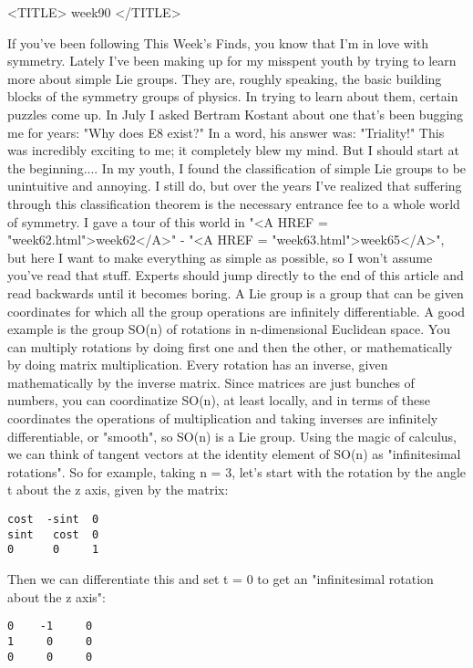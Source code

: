 
<TITLE> week90 </TITLE>


If you've been following This Week's Finds, you know that I'm in love
with symmetry.  Lately I've been making up for my misspent youth by
trying to learn more about simple Lie groups.  They are, roughly 
speaking, the basic building blocks of the symmetry groups of physics.    
In trying to learn about them, certain puzzles come up.  In July 
I asked Bertram Kostant about one that's been bugging me for years:
"Why does E8 exist?"  In a word, his answer was: "Triality!"  This was
incredibly exciting to me; it completely blew my mind.  But I should
start at the beginning....
In my youth, I found the classification of simple Lie groups to be
unintuitive and annoying.  I still do, but over the years I've
realized that suffering through this classification theorem is the
necessary entrance fee to a whole world of symmetry.  I gave a tour of 
this world in "<A HREF = "week62.html">week62</A>" - "<A HREF = 
"week63.html">week65</A>", but here I want to make everything as
simple as possible, so I won't assume you've read that stuff.  Experts
should jump directly to the end of this article and read backwards
until it becomes boring.
A Lie group is a group that can be given coordinates for which all the group
operations are infinitely differentiable.  A good example is the group
SO(n) of rotations in n-dimensional Euclidean space.  You can multiply
rotations by doing first one and then the other, or mathematically by
doing matrix multiplication.  Every rotation has an inverse, given
mathematically by the inverse matrix.  Since matrices are just bunches
of numbers, you can coordinatize SO(n), at least locally, and in terms
of these coordinates the operations of multiplication and taking inverses 
are infinitely differentiable, or "smooth", so SO(n) is a Lie group.
Using the magic of calculus, we can think of tangent vectors at the
identity element of SO(n) as "infinitesimal rotations".  So for
example, taking n = 3, let's start with the rotation by the angle t
about the z axis, given by the matrix:
\begin{verbatim}
cost  -sint  0
sint   cost  0
0      0     1
\end{verbatim}
    
Then we can differentiate this and set t = 0 to get an "infinitesimal
rotation about the z axis":
\begin{verbatim}
0    -1     0
1     0     0
0     0     0
\end{verbatim}
    
